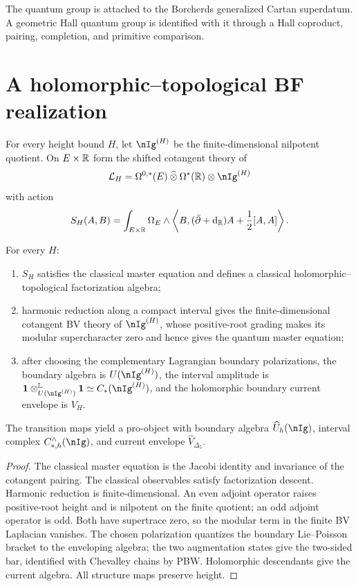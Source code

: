 \begin{remark}
The quantum group is attached to the Borcherds generalized Cartan superdatum.  A geometric Hall quantum group is identified with it through a Hall coproduct, pairing, completion, and primitive comparison.
\end{remark}

\chapter{A holomorphic--topological BF realization}
For every height bound $H$, let $\nIg^{(H)}$ be the finite-dimensional nilpotent quotient.  On $E\times\mathbb R$ form the shifted cotangent theory of
\[
 \Lcal_H=\Omega^{0,*}(E)\widehattensor\Omega^*(\R)\tensor\nIg^{(H)}
\]
with action
\[
 S_H(A,B)=\int_{E\times\mathbb R}\Omega_E\wedge
 \left\langle B,(\bar\partial+\mathrm d_{\mathbb R})A+\frac12[A,A]\right\rangle .
\]

\begin{theorem}
For every $H$:
\begin{enumerate}
\item $S_H$ satisfies the classical master equation and defines a classical holomorphic--topological factorization algebra;
\item harmonic reduction along a compact interval gives the finite-dimensional cotangent BV theory of $\nIg^{(H)}$, whose positive-root grading makes its modular supercharacter zero and hence gives the quantum master equation;
\item after choosing the complementary Lagrangian boundary polarizations, the boundary algebra is $U(\nIg^{(H)})$, the interval amplitude is $\mathbbm1\tensor^{\mathbb L}_{U(\nIg^{(H)})}\mathbbm1\simeq C_*(\nIg^{(H)})$, and the holomorphic boundary current envelope is $V_H$.
\end{enumerate}
The transition maps yield a pro-object with boundary algebra $\widehat U_h(\nIg)$, interval complex $C_{*,h}^{\wedge}(\nIg)$, and current envelope $\widehat V_{\Delta_5}$.
\end{theorem}
\begin{proof}
The classical master equation is the Jacobi identity and invariance of the cotangent pairing.  The classical observables satisfy factorization descent.  Harmonic reduction is finite-dimensional.  An even adjoint operator raises positive-root height and is nilpotent on the finite quotient; an odd adjoint operator is odd.  Both have supertrace zero, so the modular term in the finite BV Laplacian vanishes.  The chosen polarization quantizes the boundary Lie--Poisson bracket to the enveloping algebra; the two augmentation states give the two-sided bar, identified with Chevalley chains by PBW.  Holomorphic descendants give the current algebra.  All structure maps preserve height.
\end{proof}

